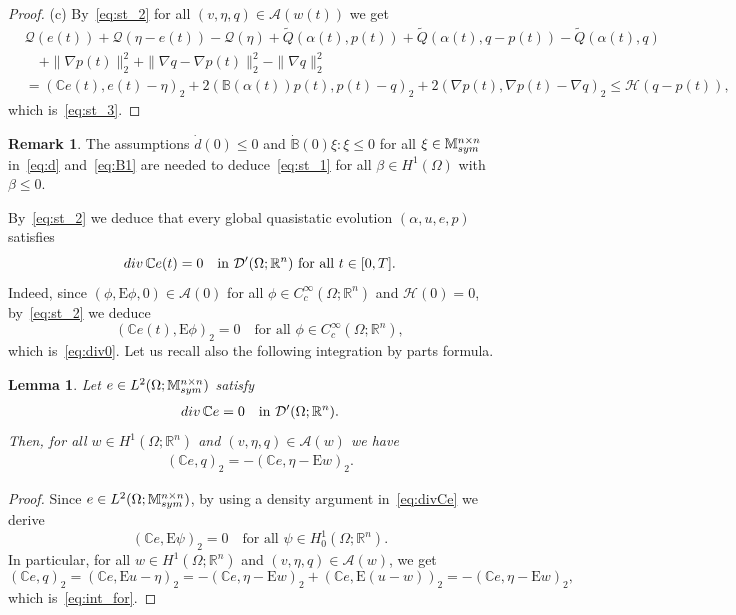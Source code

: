 \documentclass[reqno]{amsart}
\newtheorem{lemma}[corollary]{Lemma}
\theoremstyle{definition}
\newtheorem{remark}[corollary]{Remark}
\numberwithin{equation}{section}
\def\div {\mathop {\rm div}\nolimits}
\def\R {\mathbb R}
\def\M {\mathbb M^{n\times n}_{\rm sym}}
\def\C {\mathbb C}
\def\B {\mathbb B}
\def\EE {\mathrm{E}}
\begin{document}
\begin{proof}
(c) By~\eqref{eq:st_2} for all $(v,\eta,q)\in \mathcal A(w(t))$ we get
\begin{align*}
&\mathcal Q(e(t))+\mathcal Q(\eta-e(t))-\mathcal Q(\eta)+\tilde Q(\alpha(t),p(t))+\tilde Q(\alpha(t),q-p(t))-\tilde Q(\alpha(t),q)\\
&\quad+\|\nabla p(t)\|_2^2+\|\nabla q-\nabla p(t)\|_2^2-\|\nabla q\|_2^2\\
&=(\C e(t),e(t)-\eta)_2+2(\B(\alpha(t))p(t),p(t)-q)_2+2(\nabla p(t),\nabla p(t)-\nabla q)_2\le \mathcal H(q-p(t)),
\end{align*}
which is~\eqref{eq:st_3}.
\end{proof}

\begin{remark}
The assumptions $\dot d(0)\le 0$ and $\dot{\B}(0)\xi:\xi\le 0$ for all $\xi\in\M$ in~\eqref{eq:d} and~\eqref{eq:B1} are needed to deduce~\eqref{eq:st_1} for all $\beta\in H^1(\Omega)$ with $\beta\le 0$.
\end{remark}

By~\eqref{eq:st_2} we deduce that every global quasistatic evolution $(\alpha,u,e,p)$ satisfies 
\begin{equation}\label{eq:div0}
\div \C e(t)=0\quad\text{in $\mathcal D'(\Omega;\R^n)$ for all $t\in[0,T]$}.
\end{equation}
Indeed, since $(\phi,\EE \phi,0)\in\mathcal A(0)$ for all $\phi\in C_c^\infty(\Omega;\R^n)$ and $\mathcal H(0)=0$, by~\eqref{eq:st_2} we deduce
$$(\C e(t),\EE \phi)_2=0\quad\text{for all $\phi\in C_c^\infty(\Omega;\R^n)$},$$
which is~\eqref{eq:div0}. Let us recall also the following integration by parts formula.

\begin{lemma}
Let $e\in L^2(\Omega;\M)$ satisfy
\begin{align}\label{eq:divCe}
\div\C e=0\quad\text{in $\mathcal D'(\Omega;\R^n)$.}
\end{align} 
Then, for all $w\in H^1(\Omega;\R^n)$ and $(v,\eta,q)\in \mathcal A(w)$ we have
\begin{align}\label{eq:int_for}
(\C e,q)_2=-(\C e, \eta-\EE w)_2.
\end{align}
\end{lemma}
\begin{proof}
Since $e\in L^2(\Omega;\M)$, by using a density argument in~\eqref{eq:divCe} we derive
$$ (\C e,\EE \psi)_2=0\quad\text{for all $\psi\in H^1_0(\Omega;\R^n)$}.$$
In particular, for all $w\in H^1(\Omega;\R^n)$ and $(v,\eta,q)\in \mathcal A(w)$, we get
$$ (\C e,q)_2=(\C e,\EE u-\eta)_2=-(\C e, \eta-\EE w)_2+(\C e, \EE (u-w))_2=-(\C e, \eta-\EE w)_2,$$
which is~\eqref{eq:int_for}.
\end{proof}
\end{document}
